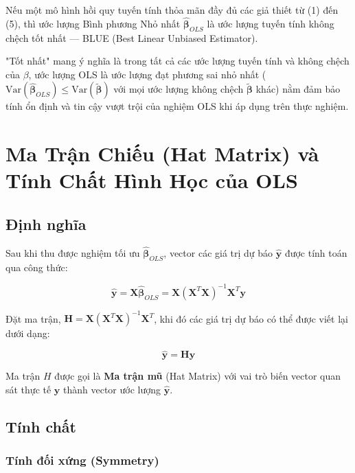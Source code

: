\begin{theorem}
    Nếu một mô hình hồi quy tuyến tính thỏa mãn đầy đủ các giả thiết từ (1) đến (5), thì ước lượng Bình phương Nhỏ nhất $\hat{\boldsymbol{\beta}}_{OLS}$ là ước lượng tuyến tính không chệch tốt nhất — BLUE (Best Linear Unbiased Estimator).
\end{theorem}

"Tốt nhất" mang ý nghĩa là trong tất cả các ước lượng tuyến tính và không chệch của $\beta$, ước lượng OLS là ước lượng đạt phương sai nhỏ nhất ($\text{Var}(\hat{\boldsymbol{\beta}}_{OLS}) \le \text{Var}(\tilde{\boldsymbol{\beta}})$ với mọi ước lượng không chệch $\tilde{\boldsymbol{\beta}}$ khác) nằm đảm bảo tính ổn định và tin cậy vượt trội của nghiệm OLS khi áp dụng trên thực nghiệm.

\section{Ma Trận Chiếu (Hat Matrix) và Tính Chất Hình Học của OLS}

\subsection{Định nghĩa}

Sau khi thu được nghiệm tối ưu $\hat{\boldsymbol{\beta}}_{OLS}$, vector các giá trị dự báo $\hat{\mathbf{y}}$ được tính toán qua công thức:

\begin{equation}
    \hat{\mathbf{y}} = \mathbf{X}\hat{\boldsymbol{\beta}}_{OLS} = \mathbf{X}(\mathbf{X}^T\mathbf{X})^{-1}\mathbf{X}^T\mathbf{y}
\end{equation}

Đặt ma trận, $\mathbf{H} = \mathbf{X}(\mathbf{X}^T\mathbf{X})^{-1}\mathbf{X}^T$, khi đó các giá trị dự báo có thể được viết lại dưới dạng:

\begin{equation}
    \hat{\mathbf{y}} = \mathbf{H}\mathbf{y}
\end{equation}

Ma trận $H$ được gọi là \textbf{Ma trận mũ} (Hat Matrix) với vai trò biến vector quan sát thực tế $\mathbf{y}$ thành vector ước lượng $\hat{\mathbf{y}}$.

\subsection{Tính chất}

\subsubsection{Tính đối xứng (Symmetry)}

